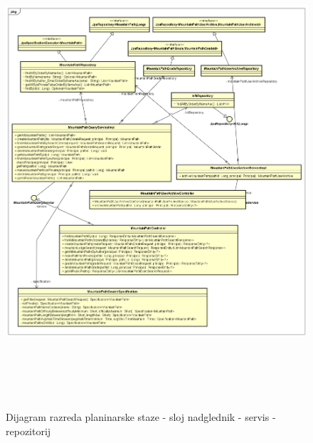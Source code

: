 		\begin{figure}[H]
			\includegraphics[scale=0.6, height=175mm, width=165mm]{dijagrami/csr-path-dijagram} %
			\centering
			\caption{Dijagram razreda planinarske staze - sloj nadglednik - servis - repozitorij}
			\label{fig:dijagrami_razreda_staze}
		\end{figure}
